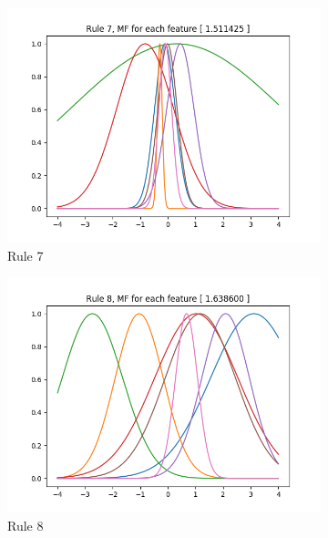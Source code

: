 \documentclass[11pt,a4paper]{article}
\begin{document}
\begin{figure}[htbp]
\ContinuedFloat
\begin{subfigure}{\columnwidth}
  \centering
  \includegraphics[width=\columnwidth,keepaspectratio]{rule-7.png}  
  \caption{Rule 7}
  \label{fig:rules:rule-7}
\end{subfigure}
\begin{subfigure}{\columnwidth}
  \centering
  \includegraphics[width=\columnwidth,keepaspectratio]{rule-8.png}  
  \caption{Rule 8}
  \label{fig:rules:rule-8}
\end{subfigure}
\begin{subfigure}{\columnwidth}
  \centering

\end{subfigure}
\end{figure}
\end{document}
